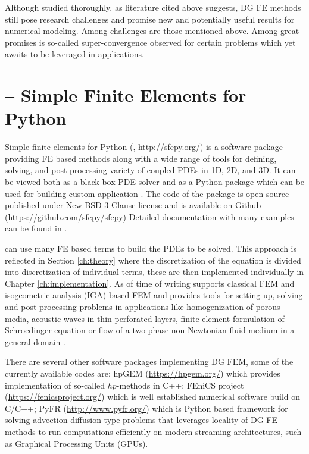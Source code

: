 Although studied thoroughly, as literature cited above suggests, DG FE methods 
still pose research challenges and promise new and potentially useful results 
for numerical modeling. Among challenges are those mentioned above. Among 
great promises is so-called super-convergence observed for certain problems 
\cite{Roe2017} which yet awaits to be leveraged in applications.


\section{\sfepy{} -- Simple Finite Elements for Python}

Simple finite elements for Python (\sfepy{}, 
\url{http://sfepy.org/}) is a software package providing FE based methods 
along with a wide range of tools for defining, solving, and post-processing 
variety of coupled PDEs in 1D, 2D, and 3D. It can be viewed both as a 
black-box PDE solver and as a Python package which can be used for building 
custom application \cite{Cimrman_Lukes_Rohan_2019}. The code of the package is 
open-source published under New BSD-3 Clause license \cite{bsd3-lic} and is 
available on Github (\url{https://github.com/sfepy/sfepy}) %
Detailed documentation with many examples can be found in \cite{sfepy-doc}.

\sfepy{} can use many FE based terms to build the PDEs to be solved. This 
approach is reflected in Section \ref{ch:theory} where the discretization of 
the equation is divided into discretization of individual terms, these are 
then implemented individually in Chapter \ref{ch:implementation}. As of time 
of writing \sfepy{} supports classical FEM and isogeometric analysis (IGA) 
based FEM and provides tools for setting up, solving and post-processing 
problems in applications like homogenization of porous media, acoustic waves 
in thin perforated layers, finite element formulation of Schroedinger equation 
or flow of a two-phase non-Newtonian fluid medium in a general domain 
\cite{Cimrman_Lukes_Rohan_2019}.

There are several other software packages implementing  DG FEM, some of the 
currently available codes are: hpGEM \cite{hpgem2007} 
(\url{https://hpgem.org/}) which provides implementation of so-called 
$hp$-methods in C++; FEniCS project \cite{fenics2015} 
(\url{https://fenicsproject.org/}) which is well established numerical 
software build on C/C++; PyFR \cite{pyfr2014} (\url{http://www.pyfr.org/}) 
which is  Python based framework for solving advection-diffusion type problems 
that leverages locality of DG FE methods to run computations efficiently on 
modern streaming architectures, such as Graphical Processing Units 
(GPUs)\cite{pyfr2014}.

